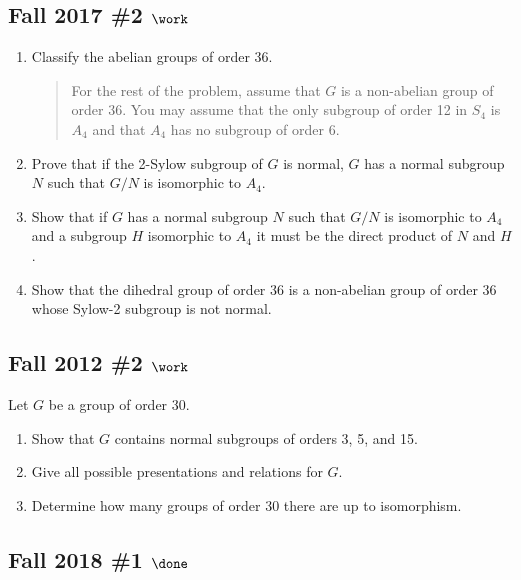 \hypertarget{fall-2017-2-work}{%
\subsection{\texorpdfstring{Fall 2017 \#2
\(\work\)}{Fall 2017 \#2 \textbackslash work}}\label{fall-2017-2-work}}

\begin{enumerate}
\def\labelenumi{\alph{enumi}.}
\item
  Classify the abelian groups of order 36.

  \begin{quote}
  For the rest of the problem, assume that \(G\) is a non-abelian group
  of order 36. You may assume that the only subgroup of order 12 in
  \(S_4\) is \(A_4\) and that \(A_4\) has no subgroup of order 6.
  \end{quote}
\item
  Prove that if the 2-Sylow subgroup of \(G\) is normal, \(G\) has a
  normal subgroup \(N\) such that \(G/N\) is isomorphic to \(A_4\).
\item
  Show that if \(G\) has a normal subgroup \(N\) such that \(G/N\) is
  isomorphic to \(A_4\) and a subgroup \(H\) isomorphic to \(A_4\) it
  must be the direct product of \(N\) and \(H\).
\item
  Show that the dihedral group of order 36 is a non-abelian group of
  order 36 whose Sylow-2 subgroup is not normal.
\end{enumerate}

\hypertarget{fall-2012-2-work}{%
\subsection{\texorpdfstring{Fall 2012 \#2
\(\work\)}{Fall 2012 \#2 \textbackslash work}}\label{fall-2012-2-work}}

Let \(G\) be a group of order 30.

\begin{enumerate}
\def\labelenumi{\alph{enumi}.}
\item
  Show that \(G\) contains normal subgroups of orders 3, 5, and 15.
\item
  Give all possible presentations and relations for \(G\).
\item
  Determine how many groups of order 30 there are up to isomorphism.
\end{enumerate}

\hypertarget{fall-2018-1-done}{%
\subsection{\texorpdfstring{Fall 2018 \#1
\(\done\)}{Fall 2018 \#1 \textbackslash done}}\label{fall-2018-1-done}}

